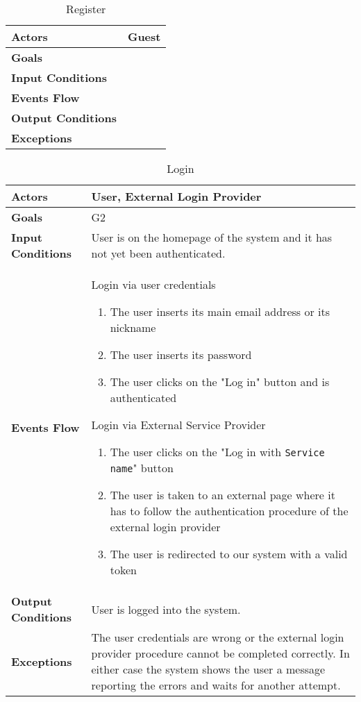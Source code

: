 

\begin{table}[H]
	\centering
	\def\arraystretch{1.5}
	\begin{tabular}{|p{7cm}|p{7cm}|}
		\hline
		\textbf{Actors}            & Guest		    \\ \hline
		\textbf{Goals}             &            \\ \hline
		\textbf{Input Conditions}  &            \\ \hline
		\textbf{Events Flow}       &            \\ \hline
		\textbf{Output Conditions} &            \\ \hline
		\textbf{Exceptions}        &            \\ \hline
	\end{tabular}
	\caption{Register}
\end{table}

\begin{table}[H]
	\centering
	\def\arraystretch{1.5}
	\begin{tabular}{|p{7cm}|p{7cm}|}
		\hline
		\textbf{Actors}            & User, External Login Provider		    \\ \hline
		\textbf{Goals}             & G2           \\ \hline
		\textbf{Input Conditions}  & User is on the homepage of the system and it has not yet been authenticated.           \\ \hline
		\textbf{Events Flow}       &    
		 	Login via user credentials
			 	\begin{enumerate}
			 		\item The user inserts its main email address or its nickname
			 		\item The user inserts its password
			 		\item The user clicks on the "Log in" button and is authenticated
			 	\end{enumerate}
		 	Login via External Service Provider
			 	\begin{enumerate}
				 	\item The user clicks on the "Log in with \texttt{Service name}" button
				 	\item The user is taken to an external page where it has to follow the authentication procedure of the external login provider
				 	\item The user is redirected to our system with a valid token
			 	\end{enumerate} \\ \hline
		\textbf{Output Conditions} & User is logged into the system.          \\ \hline
		\textbf{Exceptions}        & The user credentials are wrong or the external login provider procedure cannot be completed correctly. In either case the system shows the user a message reporting the errors and waits for another attempt.         \\ \hline
	\end{tabular}
	\caption{Login}
\end{table}


